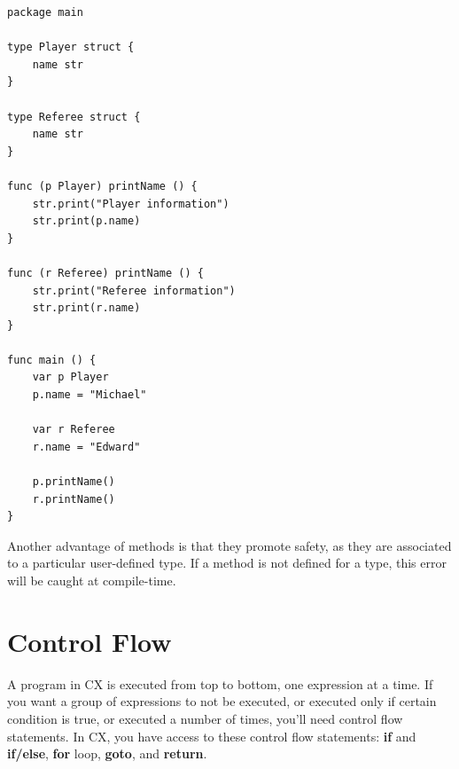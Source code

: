 \documentclass[11pt,fleqn,openany]{book} %
\begin{document}
\begin{lstlisting}[caption={Methods Example},captionpos=b,label={listing:methods-example}]
package main

type Player struct {
	name str
}

type Referee struct {
	name str
}

func (p Player) printName () {
	str.print("Player information")
	str.print(p.name)
}

func (r Referee) printName () {
	str.print("Referee information")
	str.print(r.name)
}

func main () {
	var p Player
	p.name = "Michael"
    
    var r Referee
    r.name = "Edward"

	p.printName()
    r.printName()
}
\end{lstlisting}

Another advantage of methods is that they promote safety, as they are associated to a particular user-defined type. If a method is not defined for a type, this error will be caught at compile-time.



\chapter{Control Flow}
\label{chapter:control-flow}


A program in CX is executed from top to bottom, one expression at a time. If you want a group of expressions to not be executed, or executed only if certain condition is true, or executed a number of times, you'll need control flow statements. In CX, you have access to these control flow statements: \textbf{if} and \textbf{if/else}, \textbf{for} loop, \textbf{goto}, and \textbf{return}.
\end{document}
